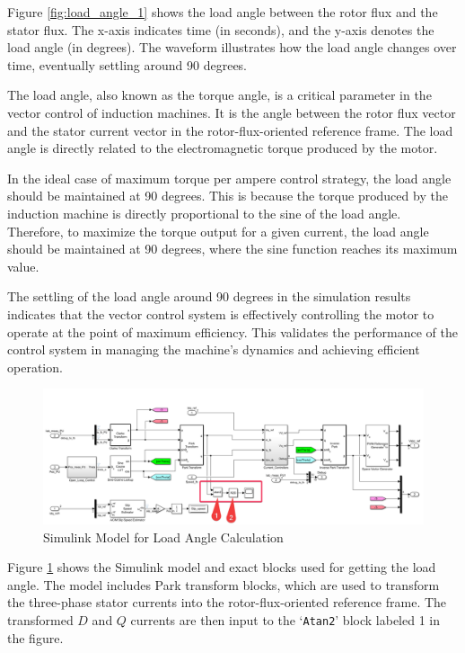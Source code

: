 Figure \ref{fig:load_angle_1} shows the load angle between the rotor flux and the stator flux. The x-axis indicates time (in seconds), and the y-axis denotes the load angle (in degrees). The waveform illustrates how the load angle changes over time, eventually settling around 90 degrees.

The load angle, also known as the torque angle, is a critical parameter in the vector control of induction machines. It is the angle between the rotor flux vector and the stator current vector in the rotor-flux-oriented reference frame. The load angle is directly related to the electromagnetic torque produced by the motor. 

In the ideal case of maximum torque per ampere control strategy, the load angle should be maintained at 90 degrees. This is because the torque produced by the induction machine is directly proportional to the sine of the load angle. Therefore, to maximize the torque output for a given current, the load angle should be maintained at 90 degrees, where the sine function reaches its maximum value.

The settling of the load angle around 90 degrees in the simulation results indicates that the vector control system is effectively controlling the motor to operate at the point of maximum efficiency. This validates the performance of the control system in managing the machine's dynamics and achieving efficient operation.


\begin{figure}[H]
	\centering
	\includegraphics[width=6in]{sections/section3/images/simulationResutls/howTogetloadAngle.png}
	\caption{Simulink Model for Load Angle Calculation}
	\label{fig:loadAngleBlocks}
\end{figure}


Figure \ref{fig:loadAngleBlocks} shows the Simulink model and exact blocks used for getting the load angle. The model includes Park transform blocks, which are used to transform the three-phase stator currents into the rotor-flux-oriented reference frame. The transformed $D$ and $Q$ currents are then input to the `\texttt{Atan2}' block labeled 1 in the figure.

